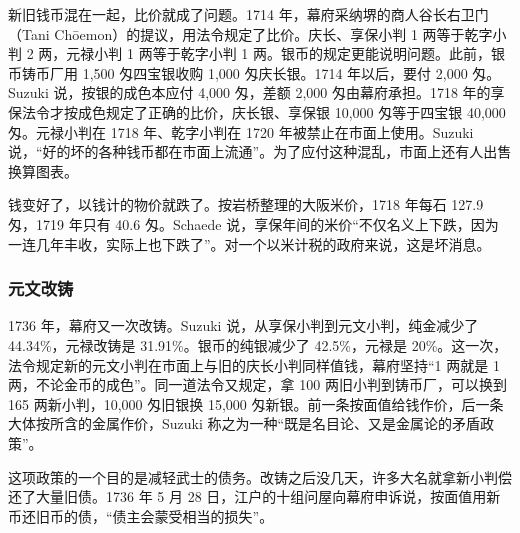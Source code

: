 新旧钱币混在一起，比价就成了问题。1714 年，幕府采纳堺的商人谷长右卫门（Tani Chōemon）的提议，用法令规定了比价。庆长、享保小判 1 两等于乾字小判 2 两，元禄小判 1 两等于乾字小判 1 两\cite{suzuki2021}。银币的规定更能说明问题。此前，银币铸币厂用 1,500 匁四宝银收购 1,000 匁庆长银。1714 年以后，要付 2,000 匁。Suzuki 说，按银的成色本应付 4,000 匁，差额 2,000 匁由幕府承担\cite{suzuki2021}。1718 年的享保法令才按成色规定了正确的比价，庆长银、享保银 10,000 匁等于四宝银 40,000 匁\cite{suzuki2021}。元禄小判在 1718 年、乾字小判在 1720 年被禁止在市面上使用\cite{suzuki2021}。Suzuki 说，“好的坏的各种钱币都在市面上流通”。为了应付这种混乱，市面上还有人出售换算图表\cite{suzuki2021}。

钱变好了，以钱计的物价就跌了。按岩桥整理的大阪米价，1718 年每石 127.9 匁，1719 年只有 40.6 匁\cite{iwahashi1981}。Schaede 说，享保年间的米价“不仅名义上下跌，因为一连几年丰收，实际上也下跌了”\cite{schaede1989}。对一个以米计税的政府来说，这是坏消息。

\subsubsection{元文改铸}
1736 年，幕府又一次改铸。Suzuki 说，从享保小判到元文小判，纯金减少了 44.34\%，元禄改铸是 31.91\%。银币的纯银减少了 42.5\%，元禄是 20\%\cite{suzuki2021}。这一次，法令规定新的元文小判在市面上与旧的庆长小判同样值钱，幕府坚持“1 两就是 1 两，不论金币的成色”。同一道法令又规定，拿 100 两旧小判到铸币厂，可以换到 165 两新小判，10,000 匁旧银换 15,000 匁新银。前一条按面值给钱作价，后一条大体按所含的金属作价，Suzuki 称之为一种“既是名目论、又是金属论的矛盾政策”\cite{suzuki2021}。

这项政策的一个目的是减轻武士的债务。改铸之后没几天，许多大名就拿新小判偿还了大量旧债。1736 年 5 月 28 日，江户的十组问屋向幕府申诉说，按面值用新币还旧币的债，“债主会蒙受相当的损失”\cite{suzuki2021}。

